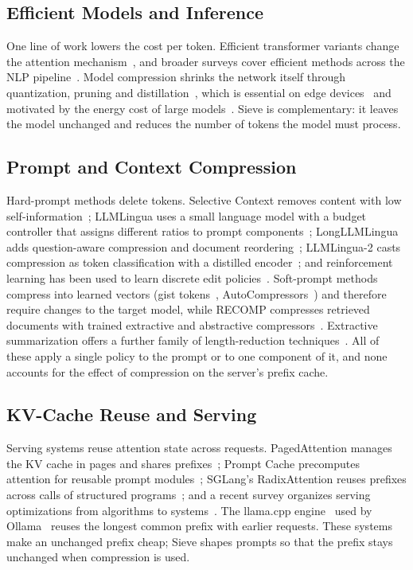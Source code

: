\documentclass[journal]{IEEEtran}
\begin{document}
\subsection{Efficient Models and Inference}
One line of work lowers the cost per token. Efficient transformer variants change the attention
mechanism~\cite{tay2022efficient,fournier2023practical}, and broader surveys cover efficient methods across the NLP
pipeline~\cite{treviso2023efficient}. Model compression shrinks the network itself through quantization, pruning and
distillation~\cite{zhu2024compression,deng2020compression,cheng2024pruning,gou2021distillation}, which is essential on edge
devices~\cite{qu2025edge} and motivated by the energy cost of large models~\cite{schwartz2020green}. Sieve is complementary: it
leaves the model unchanged and reduces the number of tokens the model must process.

\subsection{Prompt and Context Compression}
Hard-prompt methods delete tokens. Selective Context removes content with low self-information~\cite{li2023selective};
LLMLingua uses a small language model with a budget controller that assigns different ratios to prompt
components~\cite{jiang2023llmlingua}; LongLLMLingua adds question-aware compression and document
reordering~\cite{jiang2024longllmlingua}; LLMLingua-2 casts compression as token classification with a distilled
encoder~\cite{pan2024llmlingua2}; and reinforcement learning has been used to learn discrete edit policies~\cite{jung2024discrete}.
Soft-prompt methods compress into learned vectors (gist tokens~\cite{mu2023gist}, AutoCompressors~\cite{chevalier2023autocompressor})
and therefore require changes to the target model, while RECOMP compresses retrieved documents with trained extractive and
abstractive compressors~\cite{xu2024recomp}. Extractive summarization offers a further family of length-reduction
techniques~\cite{elkassas2021summarization}. All of these apply a single policy to the prompt or to one component of it, and none
accounts for the effect of compression on the server's prefix cache.

\subsection{KV-Cache Reuse and Serving}
Serving systems reuse attention state across requests. PagedAttention manages the KV cache in pages and shares
prefixes~\cite{kwon2023vllm}; Prompt Cache precomputes attention for reusable prompt modules~\cite{gim2024promptcache}; SGLang's
RadixAttention reuses prefixes across calls of structured programs~\cite{zheng2024sglang}; and a recent survey organizes serving
optimizations from algorithms to systems~\cite{miao2025serving}. The llama.cpp engine~\cite{llamacpp} used by Ollama~\cite{ollama}
reuses the longest common prefix with earlier requests. These systems make an unchanged prefix cheap; Sieve shapes prompts so that
the prefix stays unchanged when compression is used.
\end{document}
